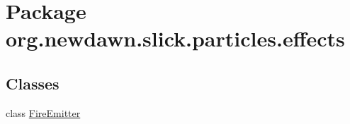 \hypertarget{namespaceorg_1_1newdawn_1_1slick_1_1particles_1_1effects}{}\section{Package org.\+newdawn.\+slick.\+particles.\+effects}
\label{namespaceorg_1_1newdawn_1_1slick_1_1particles_1_1effects}
\subsection*{Classes}
\begin{DoxyCompactItemize}
\item 
class \mbox{\hyperlink{classorg_1_1newdawn_1_1slick_1_1particles_1_1effects_1_1_fire_emitter}{Fire\+Emitter}}
\end{DoxyCompactItemize}
